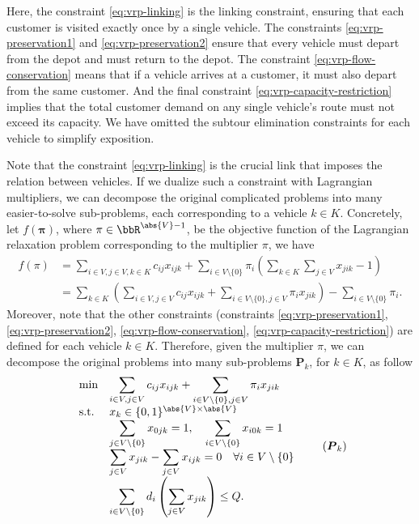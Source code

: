 Here, the constraint \eqref{eq:vrp-linking} is the linking constraint, ensuring that each customer is visited exactly once by a single vehicle. The constraints \eqref{eq:vrp-preservation1} and \eqref{eq:vrp-preservation2} ensure that every vehicle must depart from the depot and must return to the depot. The constraint \eqref{eq:vrp-flow-conservation} means that if a vehicle arrives at a customer, it must also depart from the same customer. And the final constraint \eqref{eq:vrp-capacity-restriction} implies that the total customer demand on any single vehicle's route must not exceed its capacity. We have omitted the subtour elimination constraints for each vehicle to simplify exposition. 

Note that the constraint \eqref{eq:vrp-linking} is the crucial link that imposes the relation between vehicles. If we dualize such a constraint with Lagrangian multipliers, we can decompose the original complicated problems into many easier-to-solve sub-problems, each corresponding to a vehicle $k \in K$. Concretely, let $f(\boldsymbol{\pi})$, where $\pi \in \bbR^{\abs{V} - 1}$, be the objective function of the Lagrangian relaxation problem corresponding to the multiplier $\pi$, we have
\begin{equation*}
    \begin{aligned}
        f(\pi) &= \sum_{i \in V, j \in V, k \in K}c_{ij} x_{ijk} + \sum_{i \in V \setminus\{0\}}\pi_i\left(\sum_{k \in K} \sum_{j\in V}x_{jik} - 1\right) \\
        &= \sum_{k \in K}\left(\sum_{i \in V, j \in V} c_{ij} x_{ijk} + \sum_{i\in V\setminus \{0\}, j \in V} \pi_i x_{jik}\right) - \sum_{i \in V \setminus \{0\}} \pi_i.
    \end{aligned}
\end{equation*}
Moreover, note that the other constraints (constraints \eqref{eq:vrp-preservation1}, \eqref{eq:vrp-preservation2}, \eqref{eq:vrp-flow-conservation}, \eqref{eq:vrp-capacity-restriction}) are defined for each vehicle $k \in K$. Therefore, given the multiplier $\pi$, we can decompose the original problems into many sub-problems $\boldsymbol{P}_k$, for $k \in K$, as follow
\begin{equation}
    \begin{array}{cl}
        \min & \displaystyle \sum_{i \in V, j \in V}c_{ij} x_{ijk} + \sum_{i\in V\setminus \{0\}, j \in V}\pi_i x_{jik} \\
        \mathrm{s.t.~} &  x_k \in \{0, 1\}^{\abs{V} \times \abs{V}} \\
        &\displaystyle \sum_{j \in V\setminus\{0\}} x_{0jk} = 1, \quad \sum_{i \in V \setminus \{0\}} x_{i0k} = 1\\
        & \displaystyle \sum_{j \in V} x_{jik} - \sum_{j \in V} x_{ijk} = 0 \quad \forall i\in V \setminus \{0\} \\
        & \displaystyle \sum_{i \in V \setminus \{0\}} d_i \left(\sum_{j \in V} x_{jik}\right) \leq Q.
    \end{array}
    \tag{$\boldsymbol{P}_k$}
\end{equation}

